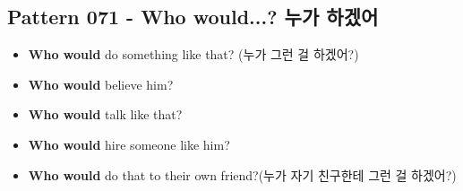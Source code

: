 \documentclass[11pt]{oblivoir}
\begin{document}
\subsection{Pattern 071 - Who would...? 누가 \texttildelow 하겠어}
\begin{itemize}
  \item \textbf{Who would} do something like that? (누가 그런 걸 하겠어?)
  \item \textbf{Who would} believe him?
  \item \textbf{Who would} talk like that?
  \item \textbf{Who would} hire someone like him?
  \item \textbf{Who would} do that to their own friend?(누가 자기 친구한테 그런 걸 하겠어?)
\end{itemize}
\end{document}
